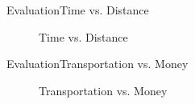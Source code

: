 \begin{frame}{Evaluation}{Time vs. Distance}
  \begin{figure}
    \centering
    
    \caption{Time vs. Distance}
  \end{figure}
\end{frame}

\begin{frame}{Evaluation}{Transportation vs. Money}
  \begin{figure}
    \centering
    
    \caption{Transportation vs. Money}
  \end{figure}
\end{frame}